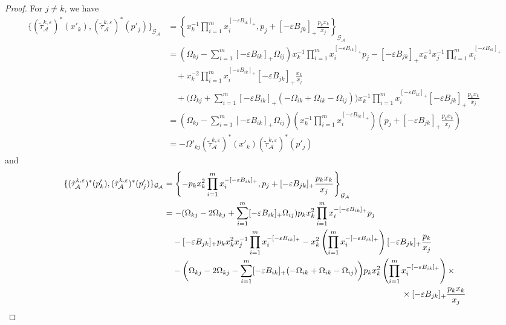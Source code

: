 \documentclass{amsart}
\numberwithin{equation}{section}
\newcommand{\cA}{\mathcal{A}}
\newcommand{\cG}{\mathcal{G}}
\begin{document}
\begin{proof}
  For $j\ne k$, we have
  \begin{align*}
    \{(\tilde\tau_\cA^{k,\varepsilon})^*(x'_k),(\tilde\tau_\cA^{k,\varepsilon})^*(p'_j)\}_{\cG_\cA}
    &=\left\{x_k^{-1}\prod\limits_{i=1}^m x_i^{[-\varepsilon B_{ik}]_+},p_j+[-\varepsilon B_{jk}]_+\frac{p_k x_k}{x_j}\right\}_{\cG_\cA}\\
    &=(\Omega_{kj} - \sum\limits_{i=1}^m [-\varepsilon B_{ik}]_+ \Omega_{ij}) x_k^{-1}\prod\limits_{i=1}^m x_i^{[-\varepsilon B_{ik}]_+} p_j - [-\varepsilon B_{jk}]_+ x_k^{-1} x_j^{-1} \prod\limits_{i=1}^m x_i^{[-\varepsilon B_{ik}]_+}\\
    &\quad + x_k^{-2}\prod\limits_{i=1}^m x_i^{[-\varepsilon B_{ik}]_+} [-\varepsilon B_{jk}]_+\frac{x_k}{x_j}\\
    &\quad + \bigg(\Omega_{kj} + \sum\limits_{i=1}^m [-\varepsilon B_{ik}]_+ (-\Omega_{ik} + \Omega_{ik} - \Omega_{ij}) \bigg) x_k^{-1}\prod\limits_{i=1}^m x_i^{[-\varepsilon B_{ik}]_+} [-\varepsilon B_{jk}]_+\frac{p_k x_k}{x_j}\\
    &=(\Omega_{kj} - \sum\limits_{i=1}^m [-\varepsilon B_{ik}]_+ \Omega_{ij}) (x_k^{-1}\prod\limits_{i=1}^m x_i^{[-\varepsilon B_{ik}]_+}) (p_j+[-\varepsilon B_{jk}]_+\frac{p_k x_k}{x_j})\\
    &= -\Omega'_{kj}(\tilde\tau_\cA^{k,\varepsilon})^*(x'_k) (\tilde\tau_\cA^{k,\varepsilon})^*(p'_j)
  \end{align*}
  and
  \begin{align*}
    \{(\tilde\tau_\cA^{k,\varepsilon})^*(p'_k),(\tilde\tau_\cA^{k,\varepsilon})^*(p'_j)\}_{\cG_\cA}
    &=\left\{-p_k x_k^2 \prod\limits_{i=1}^m x_i^{-[-\varepsilon B_{ik}]_+},p_j + [-\varepsilon B_{jk}]_+ \frac{p_k x_k}{x_j}\right\}_{\cG_\cA}\\
    &=-(\Omega_{kj} - 2\Omega_{kj} + \sum\limits_{i=1}^m [-\varepsilon B_{ik}]_+ \Omega_{ij}) p_k x_k^2 \prod\limits_{i=1}^m x_i^{-[-\varepsilon B_{ik}]_+} p_j\\
    &\quad - [-\varepsilon B_{jk}]_+ p_k x_k^2 x_j^{-1} \prod\limits_{i=1}^m x_i^{-[-\varepsilon B_{ik}]_+} - x_k^2 \left(\prod\limits_{i=1}^m x_i^{-[-\varepsilon B_{ik}]_+}\right) [-\varepsilon B_{jk}]_+ \frac{p_k}{x_j}\\
    &\quad - \bigg(\Omega_{kj} - 2\Omega_{kj} - \sum\limits_{i=1}^m [-\varepsilon B_{ik}]_+ (-\Omega_{ik} + \Omega_{ik} - \Omega_{ij}) \bigg) p_k x_k^2 \left(\prod\limits_{i=1}^m x_i^{-[-\varepsilon B_{ik}]_+}\right)\times\\
    &\hspace{3.9in} \times[-\varepsilon B_{jk}]_+ \frac{p_k x_k}{x_j}\\

\end{align*}
\end{proof}
\end{document}

